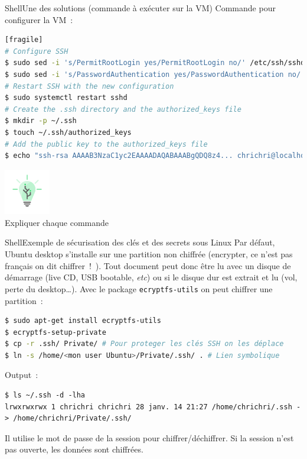 \documentclass{beamer}
\begin{document}
    \begin{frame}[fragile]{Shell}{Une des solutions (commande à exécuter sur la VM)}
        Commande pour configurer la VM~:
        \begin{lstlisting}[language=bash][fragile]
# Configure SSH
$ sudo sed -i 's/PermitRootLogin yes/PermitRootLogin no/' /etc/ssh/sshd_config
$ sudo sed -i 's/PasswordAuthentication yes/PasswordAuthentication no/' /etc/ssh/sshd_config
# Restart SSH with the new configuration
$ sudo systemctl restart sshd
# Create the .ssh directory and the authorized_keys file
$ mkdir -p ~/.ssh
$ touch ~/.ssh/authorized_keys
# Add the public key to the authorized_keys file
$ echo "ssh-rsa AAAAB3NzaC1yc2EAAAADAQABAAABgQDQ8z4... chrichri@localhost" >> ~/.ssh/authorized_keys
        \end{lstlisting}
        \begin{center}
            \includegraphics[width=2cm]{image/digicomp-lightbulb} \\ Expliquer chaque commande \\
        \end{center}
    \end{frame}

    \begin{frame}[fragile]{Shell}{Exemple de sécurisation des clés et des secrets sous Linux}
        Par défaut, Ubuntu desktop s’installe sur une partition non
        chiffrée (encrypter, ce n’est pas français on dit chiffrer~!~).
        Tout document peut donc être lu avec un disque de
        démarrage (live CD, USB bootable, \textit{etc}) ou si le disque dur
        est extrait et lu (vol, perte du desktop\ldots).
        \bigbreak
        Avec le package \lstinline{ecryptfs-utils} on peut chiffrer une partition~:
        \begin{lstlisting}[language=bash]
$ sudo apt-get install ecryptfs-utils
$ ecryptfs-setup-private
$ cp -r .ssh/ Private/ # Pour proteger les clés SSH on les déplace
$ ln -s /home/<mon user Ubuntu>/Private/.ssh/ . # Lien symbolique
        \end{lstlisting}
        Output~:
        \begin{lstlisting}
$ ls ~/.ssh -d -lha
lrwxrwxrwx 1 chrichri chrichri 28 janv. 14 21:27 /home/chrichri/.ssh -> /home/chrichri/Private/.ssh/
        \end{lstlisting}
        Il utilise le mot de passe de la session pour chiffrer/déchiffrer.
        Si la session n'est pas ouverte, les données sont chiffrées.
    \end{frame}
\end{document}
